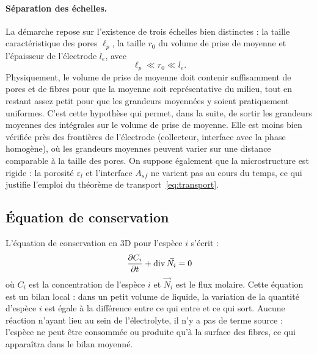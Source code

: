 \paragraph{Séparation des échelles.} La démarche repose sur l'existence de trois
échelles bien distinctes : la taille caractéristique des pores $\ell_p$, la
taille $r_0$ du volume de prise de moyenne et l'épaisseur de l'électrode $l_e$,
avec
\begin{equation}
\ell_p \ll r_0 \ll l_e .
\label{eq:separation_echelles}
\end{equation}
Physiquement, le volume de prise de moyenne doit contenir suffisamment de pores
et de fibres pour que la moyenne soit représentative du milieu, tout en restant
assez petit pour que les grandeurs moyennées y soient pratiquement uniformes.
C'est cette hypothèse qui permet, dans la suite, de sortir les grandeurs
moyennes des intégrales sur le volume de prise de moyenne. Elle est moins bien
vérifiée près des frontières de l'électrode (collecteur, interface avec la
phase homogène), où les grandeurs moyennes peuvent varier sur une distance
comparable à la taille des pores. On suppose également que la microstructure
est rigide : la porosité $\varepsilon_l$ et l'interface $A_{sf}$ ne varient pas
au cours du temps, ce qui justifie l'emploi du théorème de
transport~\eqref{eq:transport}.



\subsection*{Équation de conservation}


L'équation de conservation en 3D pour l'espèce $i$ s'écrit :
\begin{equation}
\frac{\partial C_i}{\partial t} + \operatorname{div} \vec{N}_i = 0
\label{eq:cons3D}
\end{equation}
où $C_i$ est la concentration de l'espèce $i$ et $\vec{N}_i$ est le flux molaire.
Cette équation est un bilan local : dans un petit volume de liquide, la
variation de la quantité d'espèce $i$ est égale à la différence entre ce qui
entre et ce qui sort. Aucune réaction n'ayant lieu au sein de l'électrolyte,
il n'y a pas de terme source : l'espèce ne peut être consommée ou produite
qu'à la surface des fibres, ce qui apparaîtra dans le bilan moyenné.

